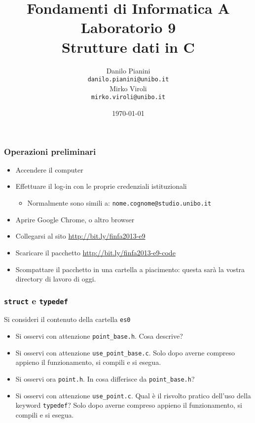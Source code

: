 \documentclass{beamer}
\begin{document}
\title[Lab1 - FV]{Fondamenti di Informatica A \\ Laboratorio 9 \\ Strutture dati in C}
\author[Danilo Pianini]{Danilo Pianini\\\texttt{danilo.pianini@unibo.it} \\ \vspace{3pt} Mirko Viroli\\\texttt{mirko.viroli@unibo.it} }
\date[\today]{\today}

\frame{\titlepage} 

\begin{frame}[fragile]
\frametitle{Operazioni preliminari}
\begin{itemize}
 \item Accendere il computer
 \item Effettuare il log-in con le proprie credenziali istituzionali
  \begin{itemize}
    \item Normalmente sono simili a: \texttt{nome.cognome@studio.unibo.it}
  \end{itemize}
 \item Aprire Google Chrome, o altro browser
 \item Collegarsi al sito \url{http://bit.ly/finfa2013-e9}
 \item Scaricare il pacchetto \url{http://bit.ly/finfa2013-e9-code}
 \item Scompattare il pacchetto in una cartella a piacimento: questa sarà la vostra directory di lavoro di oggi.
\end{itemize}
\end{frame}

\begin{frame}[fragile]
\frametitle{\texttt{struct} e \texttt{typedef}}
Si consideri il contenuto della cartella \texttt{es0}
\begin{itemize}
 \item Si osservi con attenzione \texttt{point\_base.h}. Cosa descrive?
 \item Si osservi con attenzione \texttt{use\_point\_base.c}. Solo dopo averne compreso appieno il funzionamento, si compili e si esegua.
 \item Si osservi ora \texttt{point.h}. In cosa differisce da \texttt{point\_base.h}?
 \item Si osservi con attenzione \texttt{use\_point.c}. Qual è il risvolto pratico dell'uso della keyword \texttt{typedef}? Solo dopo averne compreso appieno il funzionamento, si compili e si esegua.
\end{itemize}
\end{frame}
\end{document}
